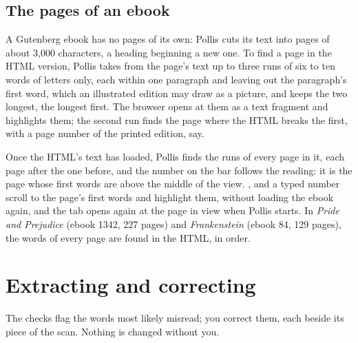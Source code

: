 \subsection{The pages of an ebook}
A Gutenberg ebook has no pages of its own: Pollis cuts its text into pages of about 3,000 characters, a heading
beginning a new one. To find a page in the HTML version, Pollis takes from the page's text up to three runs of six to
ten words of letters only, each within one paragraph and leaving out the paragraph's first word, which an illustrated
edition may draw as a picture, and keeps the two longest, the longest first. The browser opens at them as a text
fragment and highlights them; the second run finds the page where the HTML breaks the first, with a page number of the
printed edition, say.

Once the HTML's text has loaded, Pollis finds the runs of every page in it, each page after the one before, and the
number on the bar follows the reading: it is the page whose first words are above the middle of the view.
,  and a typed number scroll to the page's first words and highlight them, without
loading the ebook again, and the tab opens again at the page in view when Pollis starts. In \emph{Pride and Prejudice}
(ebook 1342, 227 pages) and \emph{Frankenstein} (ebook 84, 129 pages), the words of every page are found in the HTML,
in order.

\section{Extracting and correcting}\label{sec:correct}
The checks flag the words most likely misread; you correct them, each beside its piece of the scan. Nothing is changed
without you.

